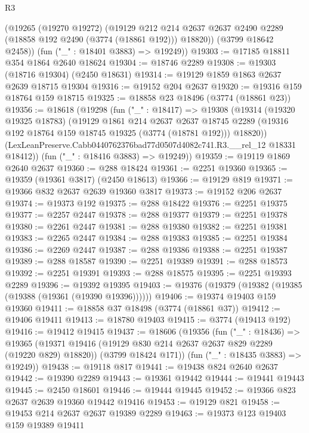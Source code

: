 \begin{lexlean}{R3}
\begin{coremodule}
        (@19265
          (@19270 @19272)
          (@19129
            @212
            @214
            @2637
            @2637
            @2490
            @2289
            (@18858 @192 @2490 (@3774 (@18861 @192)))
            @18820))
        (@3799 @18642 @2458))
      (fun ("_" : @18401 @3883) => @19249))
@19303 := @17185 @18811 @354 @1864 @2640 @18624
@19304 := @18746 @2289
@19308 := @19303 (@18716 @19304) (@2450 @18631)
@19314 := @19129 @1859 @1863 @2637 @2639 @18715 @19304
@19316 := @19152 @204 @2637
@19320 := @19316 @159 @18764 @159 @18715
@19325 := @18858 @23 @18496 (@3774 (@18861 @23))
@19356 := @18618
    (@19298
      (fun ("_" : @18417) =>
      @19308
        (@19314
          (@19320 @19325 @18783)
          (@19129
            @1861
            @214
            @2637
            @2637
            @18745
            @2289
            (@19316 @192 @18764 @159 @18745 @19325 (@3774 (@18781 @192)))
            @18820))
        (LexLeanPreserve.Cabb0440762376bad77d0507d4082c741.R3.__rel_12 @18331 @18412))
      (fun ("_" : @18416 @3883) => @19249))
@19359 := @19119 @1869 @2640 @2637
@19360 := @288 @18424
@19361 := @2251 @19360
@19365 := @19359 (@19361 @3817) (@2450 @18613)
@19366 := @19129 @819
@19371 := @19366 @832 @2637 @2639 @19360 @3817
@19373 := @19152 @206 @2637
@19374 := @19373 @192
@19375 := @288 @18422
@19376 := @2251 @19375
@19377 := @2257 @2447
@19378 := @288 @19377
@19379 := @2251 @19378
@19380 := @2261 @2447
@19381 := @288 @19380
@19382 := @2251 @19381
@19383 := @2265 @2447
@19384 := @288 @19383
@19385 := @2251 @19384
@19386 := @2269 @2447
@19387 := @288 @19386
@19388 := @2251 @19387
@19389 := @288 @18587
@19390 := @2251 @19389
@19391 := @288 @18573
@19392 := @2251 @19391
@19393 := @288 @18575
@19395 := @2251 @19393 @2289
@19396 := @19392 @19395
@19403 := @19376 (@19379 (@19382 (@19385 (@19388 (@19361 (@19390 @19396))))))
@19406 := @19374 @19403 @159 @19360
@19411 := @18858 @37 @18498 (@3774 (@18861 @37))
@19412 := @19406 @19411
@19413 := @18780 @19403
@19415 := @3774 (@19413 @192)
@19416 := @19412 @19415
@19437 := @18606
    (@19356
      (fun ("_" : @18436) =>
      @19365
        (@19371 @19416 (@19129 @830 @214 @2637 @2637 @829 @2289 (@19220 @829) @18820))
        (@3799 @18424 @171))
      (fun ("_" : @18435 @3883) => @19249))
@19438 := @19118 @817
@19441 := @19438 @824 @2640 @2637
@19442 := @19390 @2289
@19443 := @19361 @19442
@19444 := @19441 @19443
@19445 := @2450 @18601
@19446 := @19444 @19445
@19452 := @19366 @823 @2637 @2639 @19360 @19442 @19416
@19453 := @19129 @821
@19458 := @19453 @214 @2637 @2637 @19389 @2289
@19463 := @19373 @123 @19403 @159 @19389 @19411

\end{coremodule}
\end{lexlean}
